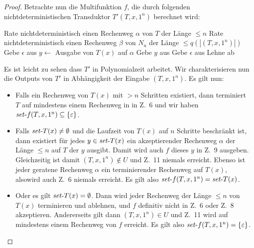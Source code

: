 \begin{proof}
    Betrachte nun die Multifunktion $f$, die durch folgenden nichtdeterministischen Transduktor $T'(T, x, 1^n)$ berechnet wird:\pagebreak[1]\\
    \begin{algorithm}[H]
        Rate nichtdeterministisch einen Rechenweg $\alpha$ von $T$ der Länge $\leq n$\;
        Rate nichtdeterministisch einen Rechenweg $\beta$ von $N_u$ der Länge $\leq q(|(T, x, 1^n)|)$\;
        {
            Gebe $\epsilon$ aus\;
        }
        {
            $y\gets $ Ausgabe von $T(x)$ auf $\alpha$\;
            Gebe $y$ aus\;
        }
        {
            Gebe $\epsilon$ aus\;
        }
        \Else
        {
            Lehne ab\;
        }
    \end{algorithm}
    Es ist leicht zu sehen dass $T'$ in Polynomialzeit arbeitet. 
    Wir charakterisieren nun die Outputs von $T'$  in Abhängigkeit der Eingabe $(T, x, 1^n)$.
    Es gilt nun:
    \begin{itemize}[nosep]
        \item Falls ein Rechenweg von $T(x)$ mit $>n$ Schritten existiert, dann terminiert $T$ auf mindestens einem Rechenweg in in Z.~6 und wir haben $\mathit{set}\text{-}{f}(T, x, 1^n)\subseteq\{\varepsilon\}$.
        \item Falls $\mathit{set}\text{-}{T}(x)\neq\emptyset$ und die Laufzeit von $T(x)$ auf $n$ Schritte beschränkt ist, dann existiert für jedes $y\in \mathit{set}\text{-}{T}(x)$ ein akzeptierender Rechenweg $\alpha$ der Länge $\leq n$ auf $T$ der $y$ ausgibt. Damit wird auch $f$ dieses $y$ in Z.~9 ausgeben.
            Gleichzeitig ist damit $(T, x, 1^n)\not\in U$ und Z.~11 niemals erreicht.
            Ebenso ist jeder geratene Rechenweg $\alpha$ ein terminierender Rechenweg auf $T(x)$, alsowird auch Z.~6 niemals erreicht.
            Es gilt also $\mathit{set}\text{-}{f}(T, x, 1^n)=\mathit{set}\text{-}{T}(x)$.
        \item Oder es gilt $\mathit{set}\text{-}{T}(x)=\emptyset$.
            Dann wird jeder Rechenweg der Länge $\leq n$ von $T(x)$ terminieren und ablehnen, und $f$ definitiv nicht in Z.~6 oder Z.~8 akzeptieren.
            Andererseits gilt dann $(T, x, 1^n)\in U$ und Z.~11 wird auf mindestens einem Rechenweg von $f$ erreicht.
            Es gilt also $\mathit{set}\text{-}{f}(T, x, 1^n)=\{\varepsilon\}$.
    \end{itemize}


\end{proof}
